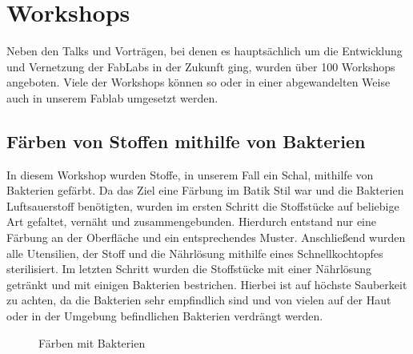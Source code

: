\documentclass{\basedir/fablab-document}
\begin{document}
\section*{Workshops}

Neben den Talks und Vorträgen, bei denen es hauptsächlich um die
Entwicklung und Vernetzung der FabLabs in der Zukunft ging, wurden über
100 Workshops angeboten. Viele der Workshops können so oder in einer
abgewandelten Weise auch in unserem Fablab umgesetzt werden.

\subsection*{Färben von Stoffen mithilfe von Bakterien}

In diesem Workshop wurden Stoffe, in unserem Fall ein Schal, mithilfe
von Bakterien gefärbt. Da das Ziel eine Färbung im Batik Stil war und
die Bakterien Luftsauerstoff benötigten, wurden im ersten Schritt die
Stoffstücke auf beliebige Art gefaltet, vernäht und zusammengebunden.
Hierdurch entstand nur eine Färbung an der Oberfläche und ein
entsprechendes Muster. Anschließend wurden alle Utensilien, der Stoff
und die Nährlösung mithilfe eines Schnellkochtopfes sterilisiert. Im
letzten Schritt wurden die Stoffstücke mit einer Nährlösung getränkt und
mit einigen Bakterien bestrichen. Hierbei ist auf höchste Sauberkeit zu
achten, da die Bakterien sehr empfindlich sind und von vielen auf der
Haut oder in der Umgebung befindlichen Bakterien verdrängt werden.

\begin{figure}[htbp]
	\noindent{}
	\caption{Färben mit Bakterien}
	\label{faerben-von-stoffen-mithilfe-von-bakterien}
\end{figure}
\end{document}
